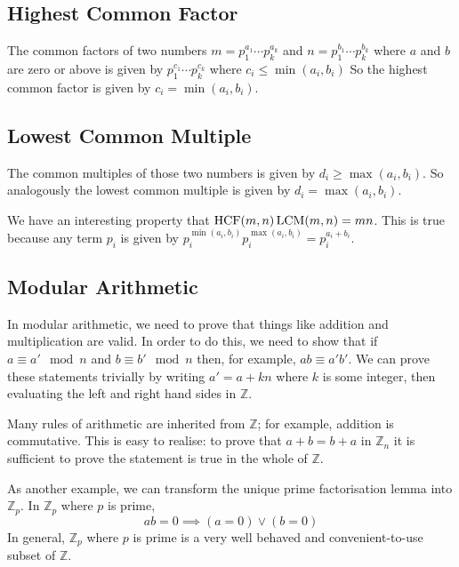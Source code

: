 \subsection{Highest Common Factor}
The common factors of two numbers \(m = p_1^{a_1} \cdots p_k^{a_k}\) and \(n = p_1^{b_1} \cdots p_k^{b_k}\) where \(a\) and \(b\) are zero or above is given by \(p_1^{c_1} \cdots p_k^{c_k}\) where \(c_i \leq \min(a_i, b_i)\) So the highest common factor is given by \(c_i = \min(a_i, b_i)\).

\subsection{Lowest Common Multiple}
The common multiples of those two numbers is given by \(d_i \geq \max(a_i, b_i)\). So analogously the lowest common multiple is given by \(d_i = \max(a_i, b_i)\).

We have an interesting property that \(\operatorname{HCF}(m, n) \operatorname{LCM}(m, n) = mn\). This is true because any term \(p_i\) is given by \(p_i^{\min(a_i, b_i)}p_i^{\max(a_i, b_i)} = p_i^{a_i + b_i}\).

\subsection{Modular Arithmetic}
In modular arithmetic, we need to prove that things like addition and multiplication are valid. In order to do this, we need to show that if \(a \equiv a' \mod n\) and \(b \equiv b' \mod n\) then, for example, \(ab \equiv a'b'\). We can prove these statements trivially by writing \(a' = a + kn\) where \(k\) is some integer, then evaluating the left and right hand sides in \(\mathbb Z\).

Many rules of arithmetic are inherited from \(\mathbb Z\); for example, addition is commutative. This is easy to realise: to prove that \(a + b = b + a\) in \(\mathbb Z_n\) it is sufficient to prove the statement is true in the whole of \(\mathbb Z\).

As another example, we can transform the unique prime factorisation lemma into \(\mathbb Z_p\). In \(\mathbb Z_p\) where \(p\) is prime,
\[ ab = 0 \implies (a = 0) \lor (b = 0) \]
In general, \(\mathbb Z_p\) where \(p\) is prime is a very well behaved and convenient-to-use subset of \(\mathbb Z\).

